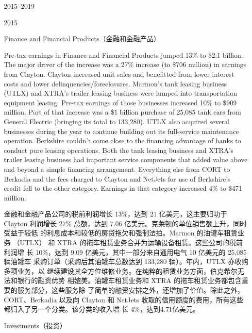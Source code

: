 \begin{chapter}{2015--2019}
\begin{section}{2015}
\begin{subsection}{Finance and Financial Products（金融和金融产品）}
\begin{verseparallel}
  {
    Pre-tax earnings in Finance and Financial Products jumped 13\% to \$2.1
    billion. The major driver of the increase was a 27\% increase (to \$706
    million) in earnings from Clayton. Clayton increased unit sales and
    benefitted from lower interest costs and lower delinquencies/foreclosures.
    Marmon's tank leasing business (UTLX) and XTRA's trailer leasing business
    were lumped into transportation equipment leasing. Pre-tax earnings of those
    businesses increased 10\% to \$909 million. Part of that increase was a \$1
    billion purchase of 25,085 tank cars from General Electric (bringing its
    total to 133,280). UTLX also acquired several businesses during the year to
    continue building out its full-service maintenance operation. Berkshire
    couldn't come close to the financing advantage of banks to conduct pure
    leasing operations. Both the tank leasing business and XTRA's trailer
    leasing business had important service components that added value above and
    beyond a simple financing arrangement. Everything else from CORT to Berkadia
    and the fees charged to Clayton and NetJets for use of Berkshire's credit
    fell to the other category. Earnings in that category increased 4\% to \$471
    million. \\
  }
  {

    金融和金融产品公司的税前利润增长 13\%，达到 21 亿美元，这主要归功于 Clayton
    利润增长 27\% 总额，达到 7.06 亿美元。克莱顿的单位销售额上升，同时受益于较低
    的利息成本和较低的房贷拖欠和强制法拍。Marmon 的油罐车租赁业务
    （UTLX） 和 XTRA 的拖车租赁业务合并为运输设备租赁。这些公司的税前利润增
    长 10\%，达到 9.09 亿美元，其中一部分来自通用电气 10 亿美元的 25,085 辆油罐车
    采购订单（采购后其油罐车总数达到 133,280 辆）。年内，UTLX 亦收购多项业务，以
    继续建设其全方位维修业务。在纯粹的租赁业务方面，伯克希尔无法和银行的融资优势
    相媲美。油罐车租赁业务和 XTRA 的拖车租赁业务都包含重要的服务部分，这些服务除
    了简单的融资安排之外，还增加了价值。除此之外，CORT、Berkadia 以及向 Clayton
    和 NetJets 收取的信用额度的费用，所有这些都归入了另一个分类。该分类的收入增
    长 4\%，达到4.71亿美元。

  }
\end{verseparallel}
\end{subsection}

\begin{subsection}{Investments（投资）}
\begin{verseparallel}
  {

}
\end{verseparallel}
\end{subsection}
\end{section}
\end{chapter}
